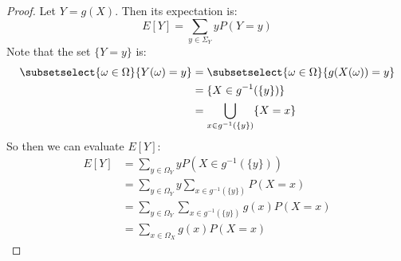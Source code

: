 \documentclass[../Main.tex]{subfiles}
\begin{document}
\begin{proof}
    Let $Y = g(X)$. Then its expectation is:
    \begin{equation*}
        E[Y] = \sum_{y \in \Sigma_Y} y P(Y = y)
    \end{equation*}
    Note that the set $\{Y = y\}$ is:
    \begin{align*}
        \subsetselect{\omega \in \Omega}{Y(\omega) = y} &= \subsetselect{\omega \in \Omega}{g(X(\omega)) = y} \\
        &= \{X \in g^{-1}(\{y\})\} \\
        &= \bigcup_{x \in g^{-1}(\{y\})} \{X = x\}
    \end{align*}
    So then we can evaluate $E[Y]$:
    \begin{align*}
        E[Y] &= \sum_{y \in \Omega_Y} y P(X \in g^{-1}(\{y\})) \\
        &= \sum_{y \in \Omega_Y} y \sum_{x \in g^{-1}(\{y\})} P(X = x) \\
        &= \sum_{y \in \Omega_Y} \sum_{x \in g^{-1}(\{y\})} g(x) P(X = x) \\
        &= \sum_{x \in \Omega_X} g(x) P(X = x)
    \end{align*}
\end{proof}
\end{document}
